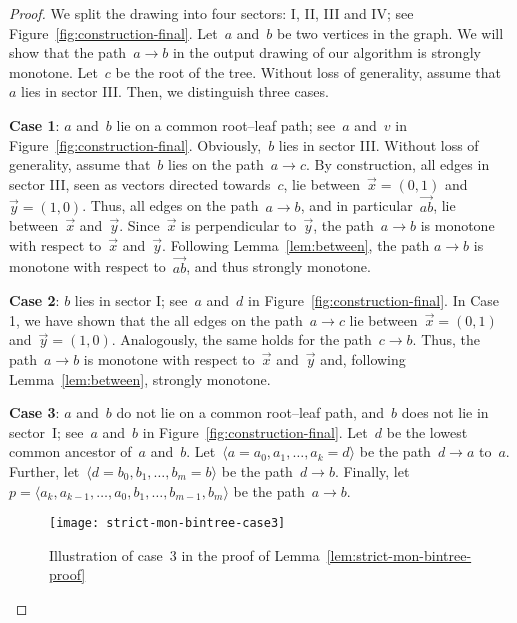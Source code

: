 \documentclass[a4paper,11pt]{article}
\theoremstyle{plain}
\begin{document}
\begin{proof}
  We split the drawing into four sectors: I, II, III and IV; see
  Figure~\ref{fig:construction-final}. Let~$a$ and~$b$ be two vertices in the 
  graph. We will show that the path~$a\to b$ in the
  output drawing of our algorithm is strongly monotone. 
  Let~$c$ be the root of the tree. Without loss of generality, assume that~$a$ 
  lies in sector III. Then, we distinguish three cases. 
  
  \textbf{Case 1}: $a$ and~$b$ lie on a common root--leaf path; see~$a$ and~$v$ 
    in Figure~\ref{fig:construction-final}. Obviously,~$b$ lies in sector III.
    Without loss of generality, assume that~$b$ lies on the path~$a\to c$.
    By construction, all edges in sector III, seen as vectors
    directed towards~$c$, lie between~$\vec x=(0,1)$ 
    and~$\vec y=(1,0)$. Thus, all edges on the path~$a\to b$, and in
    particular~$\vec{ab}$, lie between~$\vec x$ and~$\vec y$.
    Since~$\vec x$ is perpendicular to~$\vec y$, the path~$a\to b$ is
    monotone with respect to~$\vec x$ and~$\vec y$. Following
    Lemma~\ref{lem:between}, the path $a\to b$ is monotone with
    respect to~$\overrightarrow{ab}$, and thus strongly monotone.
  
  \textbf{Case 2}: $b$ lies in sector I; see~$a$ and~$d$ in
    Figure~\ref{fig:construction-final}. In Case 1, we have shown that
    the all edges on the path~$a\to c$ lie
    between~$\vec x=(0,1)$ and~$\vec y=(1,0)$. Analogously, the same holds
    for the path~$c\to b$. Thus, the path~$a\to b$ is monotone
    with respect to~$\vec x$ and~$\vec y$ and, following
    Lemma~\ref{lem:between}, strongly monotone.
  
    \textbf{Case 3}: $a$ and~$b$ do not lie on a common root--leaf
    path, and~$b$ does not lie in sector~I; see~$a$ and~$b$ in
    Figure~\ref{fig:construction-final}.  Let~$d$ be the lowest
    common ancestor of~$a$ and~$b$. Let~$\langle a=a_0,a_1,\dots,a_k=d\rangle$
    be the path~$d\to a$ to~$a$.
    Further, let~$\langle d=b_0,b_1,\dots,b_m=b\rangle$ be the path~$d\to b$. 
    Finally, let $p=\langle a_k,a_{k-1},\dots, a_0,b_1,\dots,b_{m-1},b_m\rangle$
    be the path~$a\to b$.
    
    \begin{figure}[t]
      \centering
      \texttt{[image: strict-mon-bintree-case3]}
      \caption{Illustration of case~3 in the proof of
        Lemma~\ref{lem:strict-mon-bintree-proof}}
      \label{fig:strict-mon-bintree-case3}
    \end{figure}
    

\end{proof}
\end{document}
